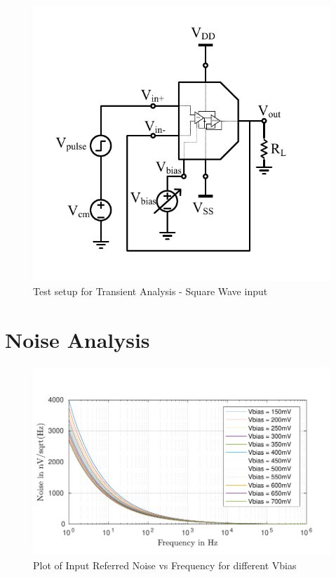 \begin{figure} [H]
\centering
\includegraphics[scale=1]{Figures/Test_Benches/Overall/SLEW.pdf}
\caption{Test setup for Transient Analysis - Square Wave input}
\end{figure}

\section{Noise Analysis}

\begin{figure} [H]
\centering
\includegraphics[scale=1]{Figures/Plots/Ov_Noise.pdf}
\caption{Plot of Input Referred Noise vs Frequency for different Vbias}
\end{figure}

